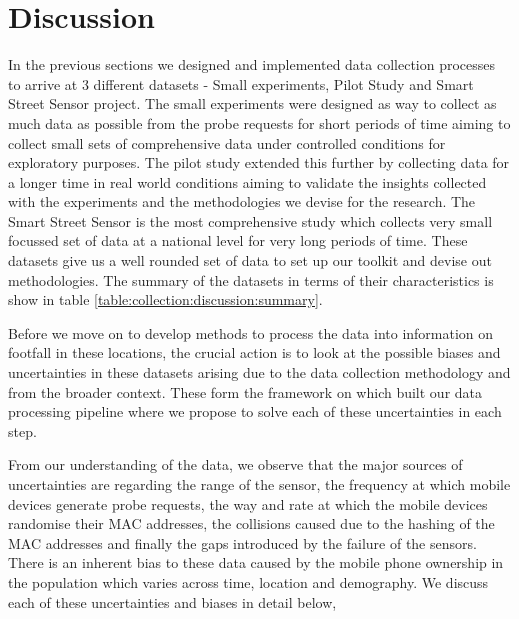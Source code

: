 \section{Discussion} \label{section:uncertainties}
In the previous sections we designed and implemented data collection processes to arrive at 3 different datasets - Small experiments, Pilot Study and Smart Street Sensor project. 
The small experiments were designed as way to collect as much data as possible from the probe requests for short periods of time aiming to collect small sets of comprehensive data under controlled conditions for exploratory purposes.
The pilot study extended this further by collecting data for a longer time in real world conditions aiming to validate the insights collected with the experiments and the methodologies we devise for the research.
The Smart Street Sensor is the most comprehensive study which collects very small focussed set of data at a national level for very long periods of time.
These datasets give us a well rounded set of data to set up our toolkit and devise out methodologies.
The summary of the datasets in terms of their characteristics is show in table \ref{table:collection:discussion:summary}.

Before we move on to develop methods to process the data into information on footfall in these locations, the crucial action is to look at the possible biases and uncertainties in these datasets arising due to the data collection methodology and from the broader context.
These form the framework on which built our data processing pipeline where we propose to solve each of these uncertainties in each step.

From our understanding of the data, we observe that the major sources of uncertainties are regarding the range of the sensor, the frequency at which mobile devices generate probe requests, the way and rate at which the mobile devices randomise their MAC addresses, the collisions caused due to the hashing of the MAC addresses and finally the gaps introduced by the failure of the sensors.
There is an inherent bias to these data caused by the mobile phone ownership in the population which varies across time, location and demography.
We discuss each of these uncertainties and biases in detail below,

